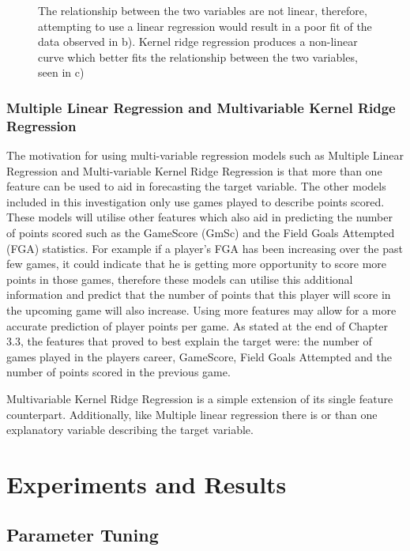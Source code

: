 \documentclass[a4paper,11pt,twoside]{article}
\begin{document}
\begin{figure} [h!]
\begin{subfigure}[b]{0.47\textwidth}
    \caption{}
    \label{fig:3}
  \end{subfigure}
\caption{The relationship between the two variables are not linear, therefore, attempting to use a linear regression would result in a poor fit of the data observed in b). Kernel ridge regression produces a non-linear curve which better fits the relationship between the two variables, seen in c)}
\end{figure}

\subsubsection{Multiple Linear Regression and Multivariable Kernel Ridge Regression}

The motivation for using multi-variable regression models such as Multiple Linear Regression and Multi-variable Kernel Ridge Regression is that more than one feature can be used to aid in forecasting the target variable. The other models included in this investigation only use games played to describe points scored. These models will utilise other features which also aid in predicting the number of points scored such as the GameScore (GmSc) and the Field Goals Attempted (FGA) statistics. For example if a player's FGA has been increasing over the past few games, it could indicate that he is getting more opportunity to score more points in those games, therefore these models can utilise this additional information and predict that the number of points that this player will score in the upcoming game will also increase. Using more features may allow for a more accurate prediction of player points per game. As stated at the end of Chapter 3.3, the features that proved to best explain the target were: the number of games played in the players career, GameScore, Field Goals Attempted and the number of points scored in the previous game.

Multivariable Kernel Ridge Regression is a simple extension of its single feature counterpart. Additionally, like Multiple linear regression there is or than one explanatory variable describing the target variable. 


\newpage

\section{Experiments and Results}
\vspace{6mm}

\subsection{Parameter Tuning}
\end{document}
